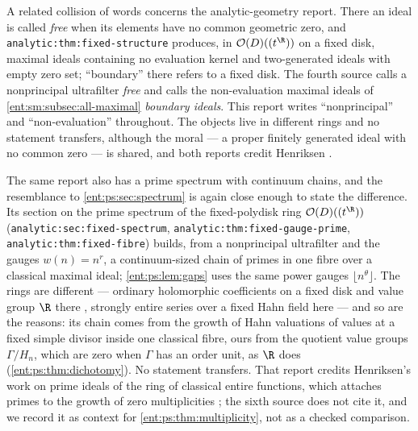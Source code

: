 \documentclass[11pt]{article}
\theoremstyle{plain}
\theoremstyle{plain}
\theoremstyle{plain}
\theoremstyle{definition}
\theoremstyle{definition}
\theoremstyle{definition}
\theoremstyle{definition}
\theoremstyle{remark}
\begin{document}
A related collision of words concerns the analytic-geometry report. There an
ideal is called \emph{free} when its elements have no common geometric zero,
and \texttt{analytic:thm:fixed-structure} produces, in $\mathcal
O(D)((t^\R))$ on a fixed disk, maximal ideals containing no evaluation kernel
and two-generated ideals with empty zero set; ``boundary'' there refers to a
fixed disk. The fourth source calls a nonprincipal ultrafilter \emph{free}
and calls the non-evaluation maximal ideals of
\cref{ent:sm:subsec:all-maximal} \emph{boundary ideals}. This report writes
``nonprincipal'' and ``non-evaluation'' throughout. The objects live in
different rings and no statement transfers, although the moral --- a proper
finitely generated ideal with no common zero --- is shared, and both reports
credit Henriksen \cite{Henriksen}.

The same report also has a prime spectrum with continuum chains, and the
resemblance to \cref{ent:ps:sec:spectrum} is again close enough to state the
difference. Its section on the prime spectrum of the fixed-polydisk ring
$\mathcal O(D)((t^\R))$ (\texttt{analytic:sec:fixed-spectrum},
\texttt{analytic:thm:fixed-gauge-prime}, \texttt{analytic:thm:fixed-fibre})
builds, from a nonprincipal ultrafilter and the gauges $w(n)=n^r$, a
continuum-sized chain of primes in one fibre over a classical maximal
ideal; \cref{ent:ps:lem:gaps} uses the same power gauges $\lfloor
n^\theta\rfloor$. The rings are different --- ordinary holomorphic
coefficients on a fixed disk and value group $\R$ there
\cite{RepoAnalyticGeometry}, strongly entire
series over a fixed Hahn field here --- and so are the reasons: its chain
comes from the growth of Hahn valuations of values at a fixed simple divisor
inside one classical fibre, ours from the quotient value groups
$\Gamma/H_n$, which are zero when $\Gamma$ has an order unit, as $\R$ does
(\cref{ent:ps:thm:dichotomy}). No statement transfers. That report credits
Henriksen's work on prime ideals of the ring of classical entire functions,
which attaches primes to the growth of zero multiplicities
\cite{Henriksen53}; the sixth source does not cite it, and we record it as
context for \cref{ent:ps:thm:multiplicity}, not as a checked comparison.
\end{document}
